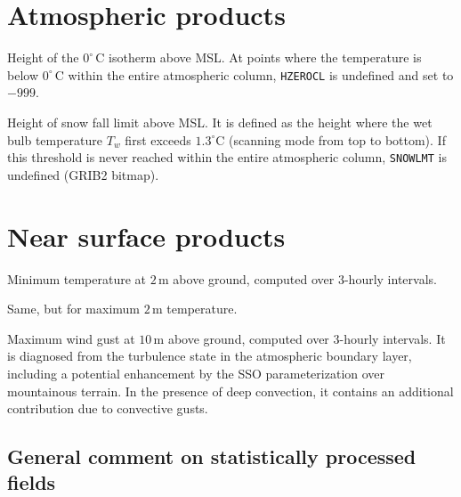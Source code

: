 \section{Atmospheric products}
\begin{description}[leftmargin=3.0cm,style=sameline]
 \item [HZEROCL] Height of the $0^{\circ}\,\mathrm{C}$ isotherm above MSL. At points where the temperature is below 
                 $0^{\circ}\,\mathrm{C}$ within the entire atmospheric column, \texttt{HZEROCL} is undefined 
                 and set to $-999$.
 \item [SNOWLMT] Height of snow fall limit above MSL. It is defined as the height where the wet bulb 
                 temperature $T_{w}$ first exceeds $1.3^{\circ}\mathrm{C}$ (scanning mode from top to bottom). 
                 If this threshold is never reached within the entire atmospheric column, \texttt{SNOWLMT} 
                 is undefined (GRIB2 bitmap).
\end{description}


\section{Near surface products}
\begin{description}[leftmargin=3.0cm,style=sameline]
  \item [TMIN\_2M]  Minimum temperature at $2\,\mathrm{m}$ above ground, computed over $3$-hourly intervals. 
  \item [TMAX\_2M]  Same, but for maximum $2\,\mathrm{m}$ temperature.
  \item [VMAX\_10M] Maximum wind gust at $10\,\mathrm{m}$ above ground, computed over $3$-hourly intervals. It is diagnosed 
                    from the turbulence state in the atmospheric boundary layer, including a potential enhancement by the 
                    SSO parameterization over mountainous terrain. In the presence of deep convection, it contains an additional 
                    contribution due to convective gusts.
\end{description}



\subsection{General comment on statistically processed fields}

